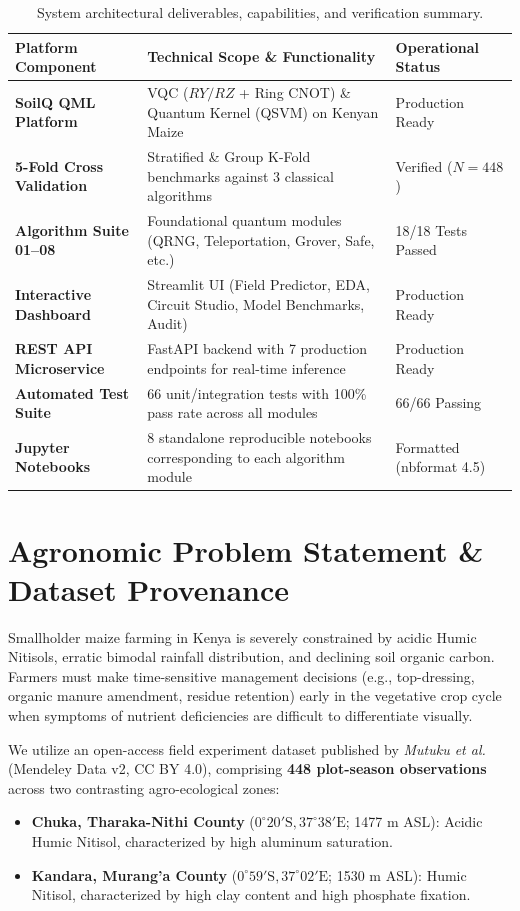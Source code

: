 \documentclass[10pt,a4paper]{article}
\begin{document}
\begin{table}[H]
\centering
\small
\begin{tabular}{lll}
\toprule
\textbf{Platform Component} & \textbf{Technical Scope \& Functionality} & \textbf{Operational Status} \\
\midrule
\textbf{SoilQ QML Platform} & VQC ($RY/RZ$ + Ring CNOT) \& Quantum Kernel (QSVM) on Kenyan Maize & Production Ready \\
\textbf{5-Fold Cross Validation} & Stratified \& Group K-Fold benchmarks against 3 classical algorithms & Verified ($N=448$) \\
\textbf{Algorithm Suite 01--08} & Foundational quantum modules (QRNG, Teleportation, Grover, Safe, etc.) & 18/18 Tests Passed \\
\textbf{Interactive Dashboard} & Streamlit UI (Field Predictor, EDA, Circuit Studio, Model Benchmarks, Audit) & Production Ready \\
\textbf{REST API Microservice} & FastAPI backend with 7 production endpoints for real-time inference & Production Ready \\
\textbf{Automated Test Suite} & 66 unit/integration tests with 100\% pass rate across all modules & 66/66 Passing \\
\textbf{Jupyter Notebooks} & 8 standalone reproducible notebooks corresponding to each algorithm module & Formatted (nbformat 4.5) \\
\bottomrule
\end{tabular}
\caption{System architectural deliverables, capabilities, and verification summary.}
\end{table}

\section{Agronomic Problem Statement \& Dataset Provenance}
Smallholder maize farming in Kenya is severely constrained by acidic Humic Nitisols, erratic bimodal rainfall distribution, and declining soil organic carbon. Farmers must make time-sensitive management decisions (e.g., top-dressing, organic manure amendment, residue retention) early in the vegetative crop cycle when symptoms of nutrient deficiencies are difficult to differentiate visually.

We utilize an open-access field experiment dataset published by \textit{Mutuku et al.} (Mendeley Data v2, CC BY 4.0), comprising \textbf{448 plot-season observations} across two contrasting agro-ecological zones:
\begin{itemize}
    \item \textbf{Chuka, Tharaka-Nithi County} ($0^\circ 20'\text{S}, 37^\circ 38'\text{E}$; 1477 m ASL): Acidic Humic Nitisol, characterized by high aluminum saturation.
    \item \textbf{Kandara, Murang'a County} ($0^\circ 59'\text{S}, 37^\circ 02'\text{E}$; 1530 m ASL): Humic Nitisol, characterized by high clay content and high phosphate fixation.
\end{itemize}
\end{document}
